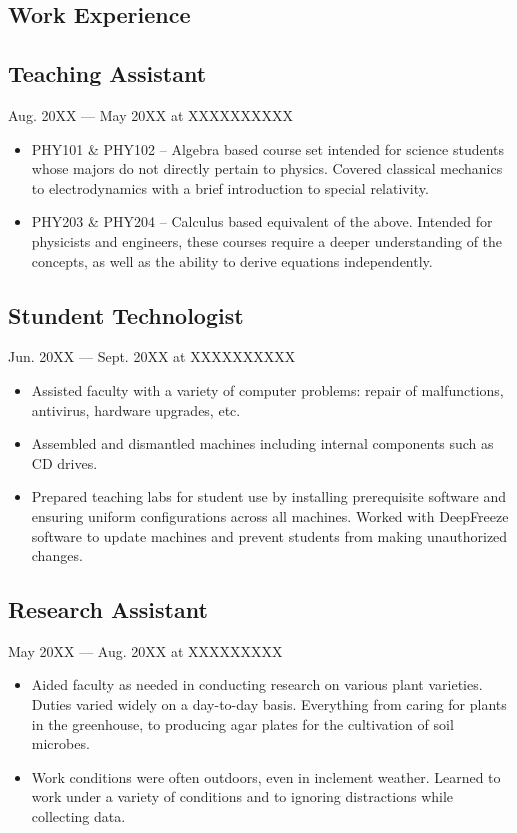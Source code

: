 \documentclass[letterpaper]{easyCV}
\begin{document}
\begin{main}
\section{Work Experience}

\subsection{Teaching Assistant}{Aug. 20XX --- May 20XX at XXXXXXXXXX}
\begin{itemize}[topsep=0ex,leftmargin=*,itemsep=0.1cm]
\item PHY101 \& PHY102 -- Algebra based course set intended for science students whose majors do not directly pertain to physics.  Covered classical mechanics to electrodynamics with a brief introduction to special relativity.
\item PHY203 \& PHY204 -- Calculus based equivalent of the above.  Intended for physicists and engineers, these courses require a deeper understanding of the concepts, as well as the ability to derive equations independently.
\end{itemize}

\subsection{Stundent Technologist}{Jun. 20XX --- Sept. 20XX at XXXXXXXXXX}
\begin{itemize}[topsep=0ex,leftmargin=*,itemsep=0.1cm]
\item Assisted faculty with a variety of computer problems: repair of malfunctions, antivirus, hardware upgrades, etc. 
\item Assembled and dismantled machines including internal components such as CD drives.
\item Prepared teaching labs for student use by installing prerequisite software and ensuring uniform configurations across all machines.  Worked with DeepFreeze software to update machines and prevent students from making unauthorized changes.
\end{itemize}

\subsection{Research Assistant}{May 20XX --- Aug. 20XX at XXXXXXXXX}
\begin{itemize}[topsep=0ex,leftmargin=*,itemsep=0.1cm]
\item Aided faculty as needed in conducting research on various plant varieties.  Duties varied widely on a day-to-day basis.  Everything from caring for plants in the greenhouse, to producing agar plates for the cultivation of soil microbes.
\item Work conditions were often outdoors, even in inclement weather.  Learned to work under a variety of conditions and to ignoring distractions while collecting data.
\end{itemize}


\end{main}
\end{document}
